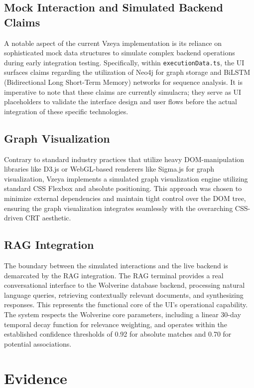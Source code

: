 \subsection{Mock Interaction and Simulated Backend Claims}
A notable aspect of the current Vzeya implementation is its reliance on sophisticated mock data structures to simulate complex backend operations during early integration testing. Specifically, within \texttt{executionData.ts}, the UI surfaces claims regarding the utilization of Neo4j for graph storage and BiLSTM (Bidirectional Long Short-Term Memory) networks for sequence analysis. It is imperative to note that these claims are currently simulacra; they serve as UI placeholders to validate the interface design and user flows before the actual integration of these specific technologies.

\subsection{Graph Visualization}
Contrary to standard industry practices that utilize heavy DOM-manipulation libraries like D3.js or WebGL-based renderers like Sigma.js for graph visualization, Vzeya implements a simulated graph visualization engine utilizing standard CSS Flexbox and absolute positioning. This approach was chosen to minimize external dependencies and maintain tight control over the DOM tree, ensuring the graph visualization integrates seamlessly with the overarching CSS-driven CRT aesthetic.

\subsection{RAG Integration}
The boundary between the simulated interactions and the live backend is demarcated by the RAG integration. The RAG terminal provides a real conversational interface to the Wolverine database backend, processing natural language queries, retrieving contextually relevant documents, and synthesizing responses. This represents the functional core of the UI's operational capability. The system respects the Wolverine core parameters, including a linear 30-day temporal decay function for relevance weighting, and operates within the established confidence thresholds of 0.92 for absolute matches and 0.70 for potential associations.

\section{Evidence}

